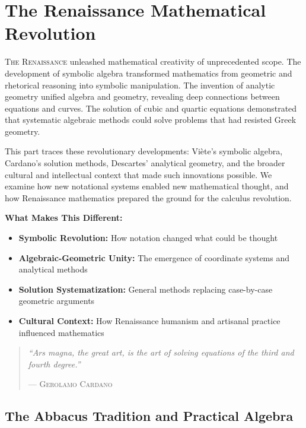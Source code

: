 
\part{The Renaissance Mathematical Revolution}
\label{part:renaissance}

\begin{partintro}
\lettrine[lines=3]{T}{he Renaissance} unleashed mathematical creativity of unprecedented scope. The development of symbolic algebra transformed mathematics from geometric and rhetorical reasoning into symbolic manipulation. The invention of analytic geometry unified algebra and geometry, revealing deep connections between equations and curves. The solution of cubic and quartic equations demonstrated that systematic algebraic methods could solve problems that had resisted Greek geometry.

This part traces these revolutionary developments: Viète's symbolic algebra, Cardano's solution methods, Descartes' analytical geometry, and the broader cultural and intellectual context that made such innovations possible. We examine how new notational systems enabled new mathematical thought, and how Renaissance mathematics prepared the ground for the calculus revolution.

\vspace{1em}
\textbf{What Makes This Different:}
\begin{itemize}[noitemsep]
    \item \textbf{Symbolic Revolution:} How notation changed what could be thought
    \item \textbf{Algebraic-Geometric Unity:} The emergence of coordinate systems and analytical methods
    \item \textbf{Solution Systematization:} General methods replacing case-by-case geometric arguments
    \item \textbf{Cultural Context:} How Renaissance humanism and artisanal practice influenced mathematics
\end{itemize}

\begin{quote}
\textit{``Ars magna, the great art, is the art of solving equations of the third and fourth degree.''}

\hfill--- \textsc{Gerolamo Cardano}
\end{quote}
\end{partintro}

\chapter{The Abbacus Tradition and Practical Algebra  }
